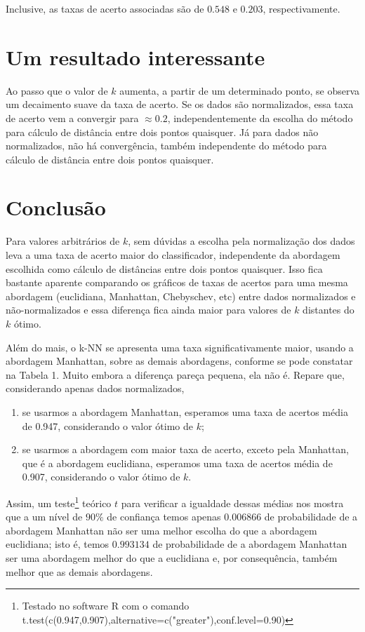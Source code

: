 \documentclass[10pt,a4paper,twocolumn]{article}
\begin{document}
      Inclusive, as taxas de acerto associadas são de $0.548$ e $0.203$,
      respectivamente.

  \section{Um resultado interessante}

    Ao passo que o valor de $k$ aumenta, a partir de um determinado ponto, se
    observa um decaimento suave da taxa de acerto. Se os dados são normalizados,
    essa taxa de acerto vem a convergir para $\approx 0.2$, independentemente da
    escolha do método para cálculo de distância entre dois pontos quaisquer. Já
    para dados não normalizados, não há convergência, também independente do
    método para cálculo de distância entre dois pontos quaisquer.

  \section{Conclusão}

    Para valores arbitrários de $k$, sem dúvidas a escolha pela normalização dos
    dados leva a uma taxa de acerto maior do classificador, independente da
    abordagem escolhida como cálculo de distâncias entre dois pontos quaisquer.
    Isso fica bastante aparente comparando os gráficos de taxas de acertos para
    uma mesma abordagem (euclidiana, Manhattan, Chebyschev, etc) entre dados
    normalizados e não-normalizados e essa diferença fica ainda maior para
    valores de $k$ distantes do $k$ ótimo.

    Além do mais, o k-NN se apresenta uma taxa significativamente maior, usando
    a abordagem Manhattan, sobre as demais abordagens, conforme se pode
    constatar na Tabela 1. Muito embora a diferença pareça pequena, ela não é.
    Repare que, considerando apenas dados normalizados,
    \begin{enumerate}
    \item
      se usarmos a abordagem Manhattan, esperamos uma taxa de acertos média de
      0.947, considerando o valor ótimo de $k$;
    \item
      se usarmos a abordagem com maior taxa de acerto, exceto pela Manhattan,
      que é a abordagem euclidiana, esperamos uma taxa de acertos média de
      0.907, considerando o valor ótimo de $k$.
    \end{enumerate}
    Assim, um teste\footnote{Testado no software R com o comando \\
    {\sf t.test(c(0.947,0.907),alternative=c("greater"),conf.level=0.90)}}
    teórico $t$ para verificar a igualdade dessas médias nos mostra que a um
    nível de $90\%$ de confiança temos apenas $0.006866$ de probabilidade de a
    abordagem Manhattan não ser uma melhor escolha do que a abordagem
    euclidiana; isto é, temos $0.993134$ de probabilidade de a abordagem
    Manhattan ser uma abordagem melhor do que a euclidiana e, por consequência,
    também melhor que as demais abordagens.
\end{document}

